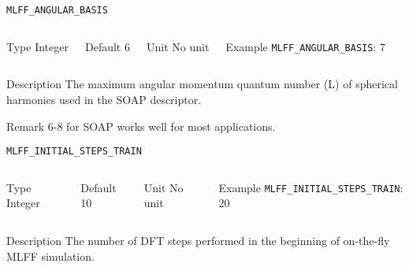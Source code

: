 \begin{frame}[allowframebreaks]{\texttt{{MLFF\_ANGULAR\_BASIS}}} \label{MLFF_ANGULAR_BASIS}
\vspace*{-12pt}
\begin{columns}
\begin{block}{Type}
Integer
\end{block}

\begin{block}{Default}
6
\end{block}

\begin{block}{Unit}
No unit
\end{block}

\begin{block}{Example}
\texttt{MLFF\_ANGULAR\_BASIS}: 7
\end{block}
\end{columns}

\begin{block}{Description}
 The maximum angular momentum quantum number (L) of spherical harmonics used in the SOAP descriptor.
\end{block}

\begin{block}{Remark}
6-8 for SOAP works well for most applications.
\end{block}
\end{frame}

\begin{frame}[allowframebreaks]{\texttt{{MLFF\_INITIAL\_STEPS\_TRAIN}}} \label{MLFF_INITIAL_STEPS_TRAIN}
\vspace*{-12pt}
\begin{columns}
\begin{block}{Type}
Integer
\end{block}

\begin{block}{Default}
10
\end{block}

\begin{block}{Unit}
No unit
\end{block}

\begin{block}{Example}
\texttt{MLFF\_INITIAL\_STEPS\_TRAIN}: 20
\end{block}
\end{columns}

\begin{block}{Description}
 The number of DFT steps performed in the beginning of on-the-fly MLFF simulation.
\end{block}

%
\end{frame}

